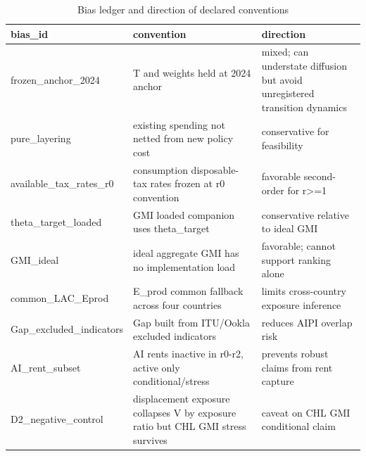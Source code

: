 \begin{table}[!htbp]
\centering
\caption{Bias ledger and direction of declared conventions}
\begin{tabular}{lll}
\toprule
bias\_id & convention & direction \\
\midrule
frozen\_anchor\_2024 & T and weights held at 2024 anchor & mixed; can understate diffusion but avoid unregistered transition dynamics \\
pure\_layering & existing spending not netted from new policy cost & conservative for feasibility \\
available\_tax\_rates\_r0 & consumption disposable-tax rates frozen at r0 convention & favorable second-order for r>=1 \\
theta\_target\_loaded & GMI loaded companion uses theta\_target & conservative relative to ideal GMI \\
GMI\_ideal & ideal aggregate GMI has no implementation load & favorable; cannot support ranking alone \\
common\_LAC\_Eprod & E\_prod common fallback across four countries & limits cross-country exposure inference \\
Gap\_excluded\_indicators & Gap built from ITU/Ookla excluded indicators & reduces AIPI overlap risk \\
AI\_rent\_subset & AI rents inactive in r0-r2, active only conditional/stress & prevents robust claims from rent capture \\
D2\_negative\_control & displacement exposure collapses V by exposure ratio but CHL GMI stress survives & caveat on CHL GMI conditional claim \\
\bottomrule
\end{tabular}
\end{table}
